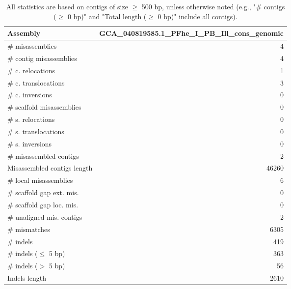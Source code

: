 \documentclass[12pt,a4paper]{article}
\begin{document}
\begin{table}[ht]
\begin{center}
\caption{All statistics are based on contigs of size $\geq$ 500 bp, unless otherwise noted (e.g., "\# contigs ($\geq$ 0 bp)" and "Total length ($\geq$ 0 bp)" include all contigs).}
\begin{tabular}{|l*{1}{|r}|}
\hline
Assembly & GCA\_040819585.1\_PFhe\_I\_PB\_Ill\_cons\_genomic \\ \hline
\# misassemblies & 4 \\ \hline
\hspace{2mm}\# contig misassemblies & 4 \\ \hline
\hspace{5mm}\# c. relocations & 1 \\ \hline
\hspace{5mm}\# c. translocations & 3 \\ \hline
\hspace{5mm}\# c. inversions & 0 \\ \hline
\hspace{2mm}\# scaffold misassemblies & 0 \\ \hline
\hspace{5mm}\# s. relocations & 0 \\ \hline
\hspace{5mm}\# s. translocations & 0 \\ \hline
\hspace{5mm}\# s. inversions & 0 \\ \hline
\# misassembled contigs & 2 \\ \hline
Misassembled contigs length & 46260 \\ \hline
\# local misassemblies & 6 \\ \hline
\# scaffold gap ext. mis. & 0 \\ \hline
\# scaffold gap loc. mis. & 0 \\ \hline
\# unaligned mis. contigs & 2 \\ \hline
\# mismatches & 6305 \\ \hline
\# indels & 419 \\ \hline
\hspace{5mm}\# indels ($\leq$ 5 bp) & 363 \\ \hline
\hspace{5mm}\# indels ($>$ 5 bp) & 56 \\ \hline
Indels length & 2610 \\ \hline
\end{tabular}
\end{center}
\end{table}
\end{document}
